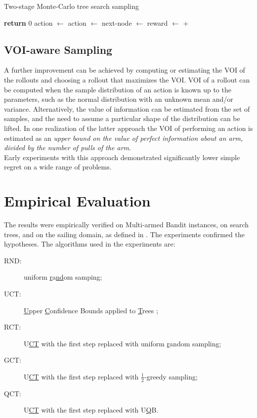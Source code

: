 \documentclass[letterpaper]{article}
\begin{document}
\begin{algorithm}[t]
\caption{Two-stage Monte-Carlo tree search sampling}
\label{alg:two-stage-mcts}
\begin{algorithmic}[1]
    \State \textbf{return} 0
  \Else
      \State action $\gets$ 
    \Else
      \State action $\gets$ 
    \EndIf
    \State next-node $\gets$ 
    \State reward $\gets$ 
     \State \hspace{4em} + 
    \State {}
  \EndIf
\EndProcedure
\end{algorithmic}
\end{algorithm}

\subsection{VOI-aware Sampling}

A further improvement can be achieved by computing or estimating the VOI
of the rollouts and choosing a rollout that maximizes the VOI. VOI of
a rollout can be computed when the sample distribution of an
action is known up to the parameters, such as the normal distribution
with an unknown mean and/or variance. Alternatively, the value of
information can be estimated from the set of samples, and the need to
assume a particular shape of the distribution can be lifted. In one
realization of the latter approach the VOI of performing an action is
estimated as an \emph{upper bound on the value of perfect information about
an arm, divided by the number of pulls of the arm}. 
\begin{equation}
\end{equation}
Early experiments with this approach demonstrated significantly lower
simple regret on a wide range of problems.

\section{Empirical Evaluation}
\label{sec:emp}

The results were empirically verified on Multi-armed Bandit instances,
on search trees, and on the sailing domain, as defined in \cite{Kocsis.uct}. The
experiments confirmed the hypotheses. The algorithms used in the
experiments are:
\begin{description}
\item[RND:] uniform \underline{r}a\underline{nd}om samping;
\item[UCT:] \underline{U}pper \underline{C}onfidence Bounds applied to
  \underline{T}rees \cite{Kocsis.uct};
\item[RCT:] U\underline{CT} with the first step replaced with uniform
  \underline{r}andom sampling;
\item[GCT:] U\underline{CT} with the first step
  replaced with $\frac 1 2$-\underline{g}reedy sampling;
\item[QCT:] U\underline{CT} with the first step
  replaced with U\underline{Q}B.
\end{description}
\end{document}
